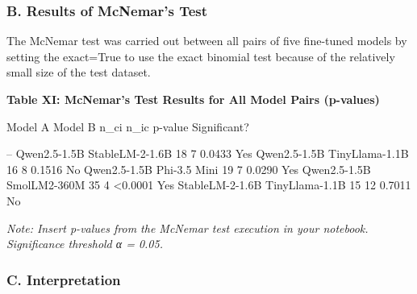 \subsubsection{B. Results of McNemar's
Test}\label{b.-results-of-mcnemars-test}

The McNemar test was carried out between all pairs of five fine-tuned
models by setting the exact=True to use the exact binomial test because
of the relatively small size of the test dataset.

\textbf{Table XI: McNemar's Test Results for All Model Pairs (p-values)}

Model A \textbar{} Model B \textbar{} n\_ci \textbar{} n\_ic \textbar{}
p-value \textbar{} Significant? \textbar{}

\textbar\textbar\textbar\textbar\textbar\textbar--\textbar{} \textbar{}
Qwen2.5-1.5B \textbar{} StableLM-2-1.6B \textbar{} 18 \textbar{} 7
\textbar{} 0.0433 \textbar{} Yes \textbar{} \textbar{} Qwen2.5-1.5B
\textbar{} TinyLlama-1.1B \textbar{} 16 \textbar{} 8 \textbar{} 0.1516
\textbar{} No \textbar{} \textbar{} Qwen2.5-1.5B \textbar{} Phi-3.5 Mini
\textbar{} 19 \textbar{} 7 \textbar{} 0.0290 \textbar{} Yes \textbar{}
\textbar{} Qwen2.5-1.5B \textbar{} SmolLM2-360M \textbar{} 35 \textbar{}
4 \textbar{} \textless0.0001 \textbar{} Yes \textbar{} \textbar{}
StableLM-2-1.6B\textbar{} TinyLlama-1.1B \textbar{} 15 \textbar{} 12
\textbar{} 0.7011 \textbar{} No \textbar{}

\emph{Note: Insert p-values from the McNemar test execution in your
notebook. Significance threshold α = 0.05.}

\subsubsection{C. Interpretation}\label{c.-interpretation}

